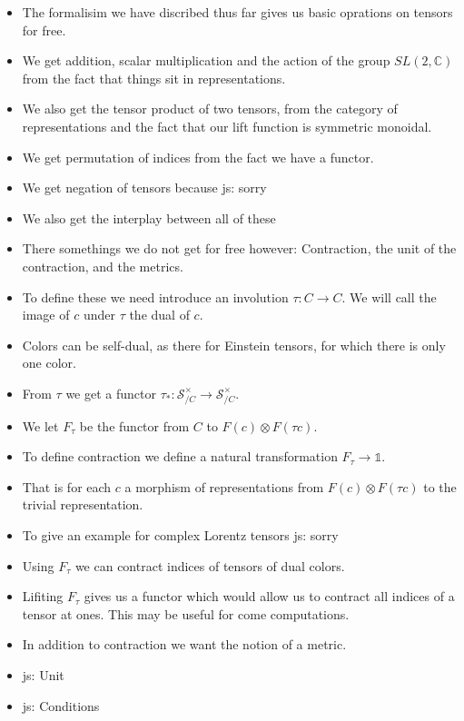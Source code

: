 \documentclass[a4paper, 11pt]{article}
\newcommand{\js}[1]{ {\color{magenta} js:  #1}}
\begin{document}
\begin{itemize} 
\item The formalisim we have discribed thus far gives us basic oprations on tensors for free.
\item We get addition, scalar multiplication and the action of the group $SL(2, \mathbb{C})$ from 
  the fact that things sit in representations. 
\item We also get the tensor product of two tensors, from the category of representations 
  and the fact that our lift function is symmetric monoidal. 
\item We get permutation of indices from the fact we have a functor. 
\item We get negation of tensors because \js{sorry}
\item We also get the interplay between all of these
\item There somethings we do not get for free however: Contraction, the unit of the contraction, 
  and the metrics. 
\item To define these we need introduce an involution $\tau : C \to C$. We will call the image of 
  $c$ under $\tau$ the dual of $c$.
\item Colors can be self-dual, as there for Einstein tensors, for which there is only one color. 
\item From $\tau$ we get a functor $\tau_* : \mathcal{S}_{/C}^\times \to \mathcal{S}_{/C}^\times$.
\item We let $F_\tau$ be the functor from $C$ to $F(c) \otimes F(\tau c)$.
\item To define contraction we define a natural transformation $ F_\tau \to \mathbb{1}$.
\item That is for each $c$ a morphism of representations from   $F(c) \otimes F(\tau c)$ to the 
  trivial representation.
\item To give an example for complex Lorentz tensors \js{sorry}
\item Using $F_\tau$ we can contract indices of tensors of dual colors. 
\item Lifiting $F_\tau$ gives us a functor which would allow us to contract all indices of a tensor
 at ones. This may be useful for come computations. 
\item In addition to contraction we want the notion of a metric.  
\item \js{Unit}
\item  \js{Conditions}
\end{itemize}
\end{document}
